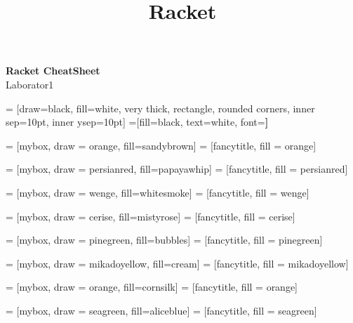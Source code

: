 \documentclass[a4paper]{article}
\title{Racket}
\begin{document}
\begin{center}{\huge{\textbf{Racket CheatSheet}}}\\
{\large Laborator1}
\end{center}
\begin{multicols*}{3}

 = [draw=black, fill=white, very thick,
    rectangle, rounded corners, inner sep=10pt, inner ysep=10pt]
 =[fill=black, text=white, font=\bfseries]

 = [mybox, draw = orange, fill=sandybrown]
 = [fancytitle, fill = orange]


 = [mybox, draw = persianred, fill=papayawhip]
 = [fancytitle, fill = persianred]

 = [mybox, draw = wenge, fill=whitesmoke]
 = [fancytitle, fill = wenge]

 = [mybox, draw = cerise, fill=mistyrose]
 = [fancytitle, fill = cerise]

 = [mybox, draw = pinegreen, fill=bubbles]
 = [fancytitle, fill = pinegreen]

 = [mybox, draw = mikadoyellow, fill=cream]
 = [fancytitle, fill = mikadoyellow]

 = [mybox, draw = orange, fill=cornsilk]
 = [fancytitle, fill = orange]

 = [mybox, draw = seagreen, fill=aliceblue]
 = [fancytitle, fill = seagreen]


\end{multicols*}
\end{document}
